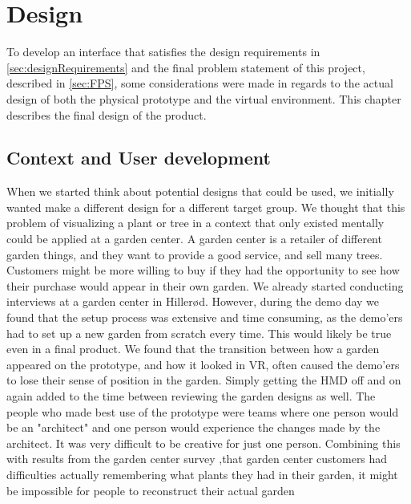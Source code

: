 \chapter{Design}
\label{chp:design}
To develop an interface that satisfies the design requirements in \autoref{sec:designRequirements} and the final problem statement of this project, described in \autoref{sec:FPS}, some considerations were made in regards to the actual design of both the physical prototype and the virtual environment. This chapter describes the final design of the product.

\section{Context and User development}
When we started think about potential designs that could be used, we initially wanted make a different design for a different target group. We thought that this problem of visualizing a plant or tree in a context that only existed mentally could be applied at a garden center. A garden center is a retailer of different garden things, and they want to provide a good service, and sell many trees. Customers might be more willing to buy if they had the opportunity to see how their purchase would appear in their own garden. We already started conducting interviews at a garden center in Hillerød. However, during the demo day we found that the setup process was extensive and time consuming, as the demo'ers had to set up a new garden from scratch every time. This would likely be true even in a final product. We found that the transition between how a garden appeared on the prototype, and how it looked in VR, often caused the demo'ers to lose their sense of position in the garden. Simply getting the HMD off and on again added to the time between reviewing the garden designs as well. The people who made best use of the prototype were teams where one person would be an "architect" and one person would experience the changes made by the architect. It was very difficult to be creative for just one person. Combining this with results from the garden center survey ,that garden center customers had difficulties actually remembering what plants they had in their garden, it might be impossible for people to reconstruct their actual garden\\

